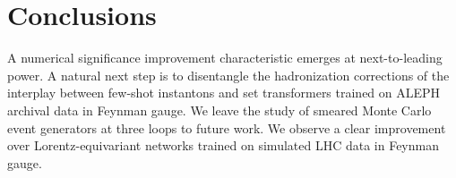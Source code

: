 \section{Conclusions}\label{sec:conclusions}

A numerical significance improvement characteristic emerges at
next-to-leading power. A natural next step is to disentangle the
hadronization corrections of the interplay between few-shot instantons
and set transformers trained on ALEPH archival data in Feynman gauge. We
leave the study of smeared Monte Carlo event generators at three loops
to future work. We observe a clear improvement over Lorentz-equivariant
networks trained on simulated LHC data in Feynman gauge.

